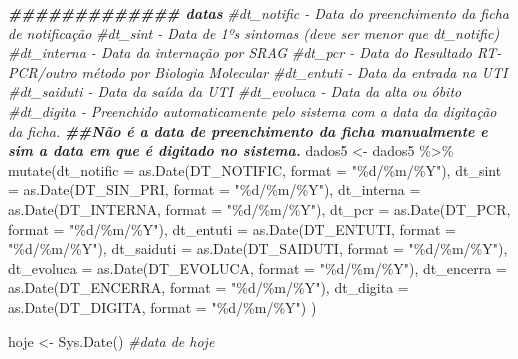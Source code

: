 \documentclass[
]{article}
\newenvironment{Shaded}{\begin{snugshade}}{\end{snugshade}}
\newcommand{\AttributeTok}[1]{\textcolor[rgb]{0.77,0.63,0.00}{#1}}
\newcommand{\CommentTok}[1]{\textcolor[rgb]{0.56,0.35,0.01}{\textit{#1}}}
\newcommand{\DocumentationTok}[1]{\textcolor[rgb]{0.56,0.35,0.01}{\textbf{\textit{#1}}}}
\newcommand{\FunctionTok}[1]{\textcolor[rgb]{0.00,0.00,0.00}{#1}}
\newcommand{\NormalTok}[1]{#1}
\newcommand{\OtherTok}[1]{\textcolor[rgb]{0.56,0.35,0.01}{#1}}
\newcommand{\SpecialCharTok}[1]{\textcolor[rgb]{0.00,0.00,0.00}{#1}}
\newcommand{\StringTok}[1]{\textcolor[rgb]{0.31,0.60,0.02}{#1}}
\begin{document}
\begin{Shaded}
\begin{Highlighting}[]
\DocumentationTok{\#\#\#\#\#\#\#\#\#\#\#\#\# datas}
\CommentTok{\#dt\_notific {-} Data do preenchimento da ficha de notificação}
\CommentTok{\#dt\_sint {-} Data de 1ºs sintomas (deve ser menor que dt\_notific)}
\CommentTok{\#dt\_interna {-} Data da internação por SRAG}
\CommentTok{\#dt\_pcr {-} Data do Resultado RT{-}PCR/outro método por Biologia Molecular}
\CommentTok{\#dt\_entuti {-} Data da entrada na UTI}
\CommentTok{\#dt\_saiduti {-} Data da saída da UTI }
\CommentTok{\#dt\_evoluca {-} Data da alta ou óbito}
\CommentTok{\#dt\_digita {-} Preenchido automaticamente pelo sistema com a data da digitação da ficha. }
\DocumentationTok{\#\#Não é a data de preenchimento da ficha manualmente e sim a data em que é digitado no sistema.}
\NormalTok{dados5 }\OtherTok{\textless{}{-}}\NormalTok{  dados5 }\SpecialCharTok{\%\textgreater{}\%} 
  \FunctionTok{mutate}\NormalTok{(}\AttributeTok{dt\_notific =} \FunctionTok{as.Date}\NormalTok{(DT\_NOTIFIC, }\AttributeTok{format =} \StringTok{"\%d/\%m/\%Y"}\NormalTok{),}
         \AttributeTok{dt\_sint =} \FunctionTok{as.Date}\NormalTok{(DT\_SIN\_PRI, }\AttributeTok{format =} \StringTok{"\%d/\%m/\%Y"}\NormalTok{),}
         \AttributeTok{dt\_interna =} \FunctionTok{as.Date}\NormalTok{(DT\_INTERNA, }\AttributeTok{format =} \StringTok{"\%d/\%m/\%Y"}\NormalTok{),}
         \AttributeTok{dt\_pcr =} \FunctionTok{as.Date}\NormalTok{(DT\_PCR, }\AttributeTok{format =} \StringTok{"\%d/\%m/\%Y"}\NormalTok{),}
         \AttributeTok{dt\_entuti  =} \FunctionTok{as.Date}\NormalTok{(DT\_ENTUTI,  }\AttributeTok{format =} \StringTok{"\%d/\%m/\%Y"}\NormalTok{),}
         \AttributeTok{dt\_saiduti =} \FunctionTok{as.Date}\NormalTok{(DT\_SAIDUTI, }\AttributeTok{format =} \StringTok{"\%d/\%m/\%Y"}\NormalTok{),}
         \AttributeTok{dt\_evoluca =} \FunctionTok{as.Date}\NormalTok{(DT\_EVOLUCA, }\AttributeTok{format =} \StringTok{"\%d/\%m/\%Y"}\NormalTok{),}
         \AttributeTok{dt\_encerra =} \FunctionTok{as.Date}\NormalTok{(DT\_ENCERRA, }\AttributeTok{format =} \StringTok{"\%d/\%m/\%Y"}\NormalTok{),}
         \AttributeTok{dt\_digita =} \FunctionTok{as.Date}\NormalTok{(DT\_DIGITA, }\AttributeTok{format =} \StringTok{"\%d/\%m/\%Y"}\NormalTok{)}
\NormalTok{  )}

\NormalTok{hoje }\OtherTok{\textless{}{-}} \FunctionTok{Sys.Date}\NormalTok{() }\CommentTok{\#data de hoje}


\end{Highlighting}
\end{Shaded}
\end{document}
